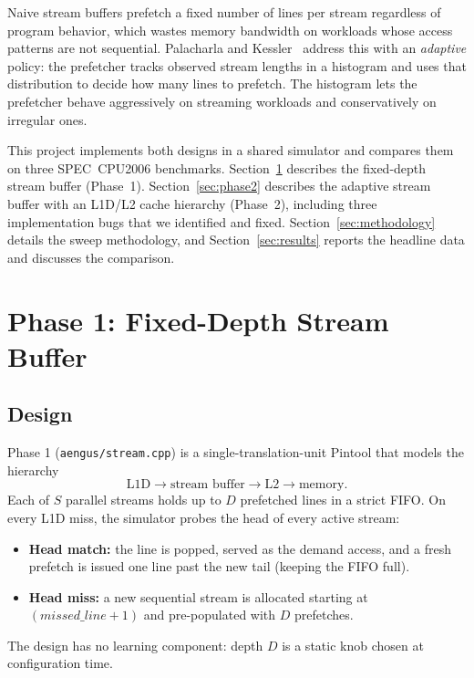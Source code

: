 \documentclass[11pt,letterpaper]{article}
\begin{document}
Naive stream buffers prefetch a fixed number of lines per stream regardless of
program behavior, which wastes memory bandwidth on workloads whose access
patterns are not sequential. Palacharla and
Kessler~\cite{palacharla1994evaluating} address this with an \emph{adaptive}
policy: the prefetcher tracks observed stream lengths in a histogram and uses
that distribution to decide how many lines to prefetch. The histogram lets the
prefetcher behave aggressively on streaming workloads and conservatively on
irregular ones.

This project implements both designs in a shared simulator and compares them
on three SPEC~CPU2006 benchmarks. Section~\ref{sec:phase1} describes the
fixed-depth stream buffer (Phase~1). Section~\ref{sec:phase2} describes the
adaptive stream buffer with an L1D/L2 cache hierarchy (Phase~2), including
three implementation bugs that we identified and fixed.
Section~\ref{sec:methodology} details the sweep methodology, and
Section~\ref{sec:results} reports the headline data and discusses the
comparison.

\section{Phase 1: Fixed-Depth Stream Buffer}
\label{sec:phase1}

\subsection{Design}
Phase 1 (\texttt{aengus/stream.cpp}) is a single-translation-unit Pintool that
models the hierarchy
$$\text{L1D} \rightarrow \text{stream buffer} \rightarrow \text{L2} \rightarrow \text{memory}.$$
Each of $S$ parallel streams holds up to $D$ prefetched lines in a strict
FIFO. On every L1D miss, the simulator probes the head of every active
stream:
\begin{itemize}
  \item \textbf{Head match:} the line is popped, served as the demand
        access, and a fresh prefetch is issued one line past the new tail
        (keeping the FIFO full).
  \item \textbf{Head miss:} a new sequential stream is allocated starting at
        $(\textit{missed\_line}+1)$ and pre-populated with $D$ prefetches.
\end{itemize}
The design has no learning component: depth $D$ is a static knob chosen at
configuration time.
\end{document}
